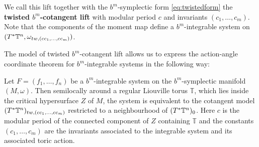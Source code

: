 We call this lift together with the $b^m$-symplectic form \ref{eq:twistedform} the {\bf twisted $b^m$-cotangent lift} with modular period $c$ and invariants $(c_1, \dots, c_m)$. Note that the components of the moment map define a $b^m$-integrable system on $(T^\ast \mathbb{T}^n, \omega_{tw, (c c_1, \dots, c c_m)})$.

The model of twisted $b^m$-cotangent lift allows us to express the action-angle coordinate theorem for $b^m$-integrable systems in the following way:

\begin{theorem} Let $F=(f_1,\ldots,f_n)$ be a $b^m$-integrable system on the $b^m$-symplectic manifold $(M,\omega)$.  Then semilocally around a regular Liouville torus $\mathbb T$, which lies inside the critical hypersurface $Z$ of $M$, the system is equivalent to the cotangent model $(T^\ast \mathbb{T}^n)_{tw, (c c_1, \dots, c c_m)} $ restricted to a neighbourhood of $(T^\ast \mathbb{T}^n)_0$. Here $c$ is the modular period of the connected component of $Z$ containing  $\mathbb T$ and the constants $(c_1, \dots, c_m)$ are the invariants associated to the integrable system and its associated toric action.
\end{theorem}


\endinput

